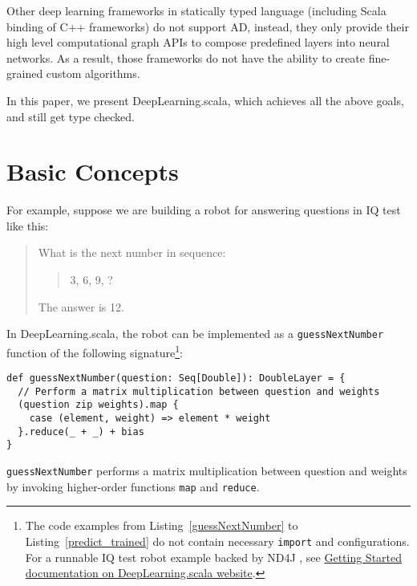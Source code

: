 Other deep learning frameworks in statically typed language (including Scala binding of C++ frameworks) \cite{intel2016bigdl,skymind2017deeplearning4j,baydin2016hype,chen2017typesafe,zhao2017deepdsl} do not support AD, instead, they only provide their high level \gls{computational graph} APIs to compose predefined layers into neural networks. As a result, those frameworks do not have the ability to create fine-grained custom algorithms.

In this paper, we present DeepLearning.scala, which achieves all the above goals, and still get type checked.

\section{Basic Concepts}
\label{concepts}

For example, suppose we are building a robot for answering questions in IQ test like this:

\begin{quote}
  What is the next number in sequence:
    \begin{quote}
    3, 6, 9, ?
    \end{quote}
  The answer is 12.
\end{quote}

In DeepLearning.scala, the robot can be implemented as a \lstinline{guessNextNumber} function of the following signature\footnote{The code examples from Listing~\ref{guessNextNumber} to Listing~\ref{predict_trained} do not contain necessary \lstinline{import} and configurations. For a runnable IQ test robot example backed by ND4J \cite{skymind2017nd4j}, see \href{http://deeplearning.thoughtworks.school/demo/GettingStarted.html}{Getting Started documentation on DeepLearning.scala website}.}:

\begin{lstlisting}[float={h t b p},caption={The differentiable matrix multiplication implemented by \lstinline{map}/\lstinline{reduce}},label={guessNextNumber}]
def guessNextNumber(question: Seq[Double]): DoubleLayer = {
  // Perform a matrix multiplication between question and weights
  (question zip weights).map {
    case (element, weight) => element * weight
  }.reduce(_ + _) + bias
}
\end{lstlisting}

\lstinline{guessNextNumber} performs a matrix multiplication between question and weights by invoking higher-order functions \lstinline{map} and \lstinline{reduce}. 

